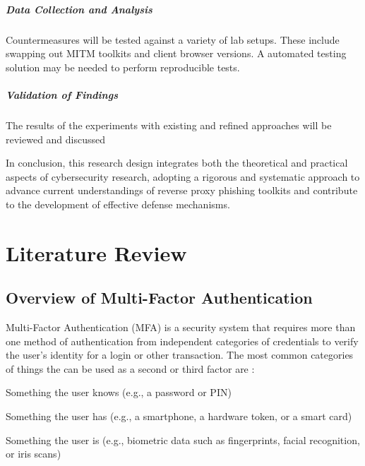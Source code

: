 \documentclass[12pt]{scrbook}
\begin{document}
\paragraph{Data Collection and Analysis}
Countermeasures will be tested against a variety of lab setups.
These include swapping out MITM toolkits and client browser versions.
A automated testing solution may be needed to perform reproducible tests.

\paragraph{Validation of Findings}
The results of the experiments with existing and refined approaches will be reviewed
and discussed

In conclusion, this research design integrates both the theoretical and practical
aspects of cybersecurity research, adopting a rigorous and systematic approach
to advance current understandings of reverse proxy phishing toolkits and
contribute to the development of effective defense mechanisms.

\newpage \chapter{Literature Review} \section{Overview of Multi-Factor
  Authentication}

Multi-Factor Authentication (MFA) is a security system that requires more than
one method of authentication from independent categories of credentials to
verify the user's identity for a login or other transaction. The most common
categories of things the can be used as a second or third factor are \cite{mfa}:
\begin{compactitem}
	\item Something the user knows (e.g., a password or PIN)
	\item Something the user has (e.g., a smartphone, a hardware token, or a smart
	card)
	\item Something the user is (e.g., biometric data such as fingerprints, facial
	recognition, or iris scans)
\end{compactitem}
\end{document}
